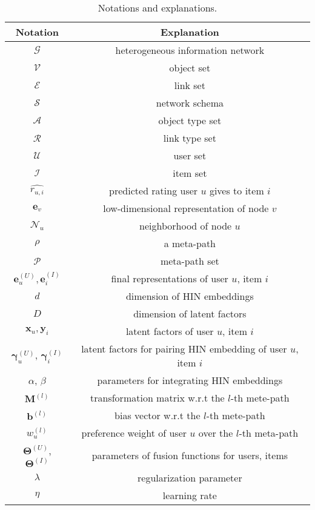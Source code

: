 \begin{table}[htbp]
\centering
\caption{Notations and explanations.}\label{tabl_notations}{
\begin{tabular}{c||c}
\hline
{Notation} & {Explanation}\\
\hline
\hline
{$\mathcal{G}$}&{heterogeneous information network}\\
\hline
{$\mathcal{V}$} & {object set} \\
\hline
{$\mathcal{E}$} & {link set} \\
\hline
{$\mathcal{S}$} & {network schema} \\
\hline
{$\mathcal{A}$} & {object type set } \\
\hline
{$\mathcal{R}$} & {link type set} \\
\hline
{$\mathcal{U}$} & {user set} \\
\hline
{$\mathcal{I}$} & {item set} \\
\hline
{$\widehat{r_{u,i}}$} & {predicted rating user $u$ gives to item $i$}\\
\hline
{$\bm{e}_v$} & {low-dimensional representation of node $v$} \\
\hline
{$\mathcal{N}_u$} & {neighborhood of node $u$} \\
\hline
{$\rho$} & {a meta-path} \\
\hline
{$\mathcal{P}$} & {meta-path set} \\
\hline
{$\bm{e}^{(U)}_u, \bm{e}^{(I)}_i$} & {final representations of  user $u$, item $i$}\\
\hline
{$d$} & {dimension of HIN embeddings} \\
\hline
{$D$} & {dimension of latent factors} \\
\hline
{$\mathbf{x}_u, \mathbf{y}_i$} & {latent factors of user $u$, item $i$} \\
\hline
{$\bm{{\gamma}}^{(U)}_u$, $\bm{{\gamma}}_i^{(I)}$} & {latent factors for pairing HIN embedding of user $u$, item $i$} \\
\hline
{$\alpha$, $\beta$} & {parameters for integrating HIN embeddings} \\
\hline
{$\mathbf{M}^{(l)}$} & { transformation matrix w.r.t the $l$-th mete-path} \\
\hline
{$\bm{b}^{(l)}$} & { bias vector w.r.t the $l$-th mete-path} \\
\hline
{$w^{(l)}_u$} & {preference weight of user $u$ over the $l$-th meta-path} \\
\hline
{$\bm{\Theta}^{(U)}$, $\bm{\Theta}^{(I)}$} & {parameters of fusion functions for users, items} \\
\hline
{$\lambda$} & {regularization parameter} \\
\hline
{$\eta$} & {learning rate} \\
\hline
\end{tabular}}
\end{table}

